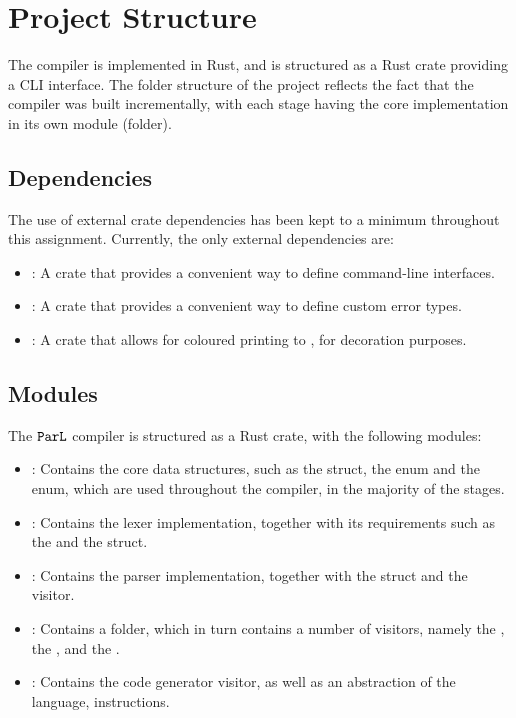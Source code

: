 \section{Project Structure}

The  compiler is implemented in Rust, and is structured as a Rust
crate providing a CLI interface. The folder structure of the project reflects
the fact that the compiler was built incrementally, with each stage having the
core implementation in its own module (folder).

\subsection{Dependencies}

The use of external crate dependencies has been kept to a minimum throughout
this assignment. Currently, the only external dependencies are:

\begin{itemize}

      \item {}: A crate that provides a convenient way to define
            command-line interfaces.

      \item {}: A crate that provides a convenient way to define
            custom error types.

      \item {}: A crate that allows for coloured printing to , for decoration purposes.
\end{itemize}

\subsection{Modules}

The $\texttt{ParL}$ compiler is structured as a Rust crate, with the following
modules:

\begin{itemize}
      \item {}: Contains the core data structures, such as the
             struct, the  enum and the  enum,
            which are used throughout the compiler, in the majority of the stages.
      \item {}: Contains the lexer implementation, together with its
            requirements such as the  and the  struct.
      \item
            : Contains the parser implementation, together with the
             struct and the  visitor.
      \item {}: Contains a  folder, which
            in turn contains a number of visitors, namely the , the , and the .
      \item {}: Contains the  code generator visitor,
            as well as an abstraction of the  language, instructions.
\end{itemize}


